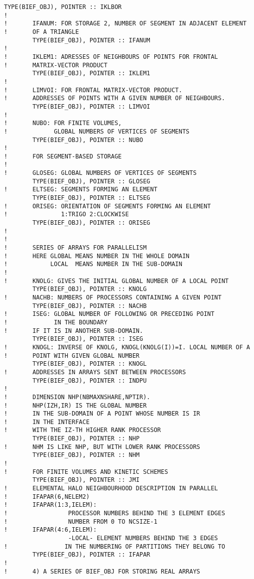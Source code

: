 \begin{lstlisting}[language=TelFortran]
        TYPE(BIEF_OBJ), POINTER :: IKLBOR
!
!       IFANUM: FOR STORAGE 2, NUMBER OF SEGMENT IN ADJACENT ELEMENT
!       OF A TRIANGLE
        TYPE(BIEF_OBJ), POINTER :: IFANUM
!
!       IKLEM1: ADRESSES OF NEIGHBOURS OF POINTS FOR FRONTAL
!       MATRIX-VECTOR PRODUCT
        TYPE(BIEF_OBJ), POINTER :: IKLEM1
!
!       LIMVOI: FOR FRONTAL MATRIX-VECTOR PRODUCT.
!       ADDRESSES OF POINTS WITH A GIVEN NUMBER OF NEIGHBOURS.
        TYPE(BIEF_OBJ), POINTER :: LIMVOI
!
!       NUBO: FOR FINITE VOLUMES,
!             GLOBAL NUMBERS OF VERTICES OF SEGMENTS
        TYPE(BIEF_OBJ), POINTER :: NUBO
!
!       FOR SEGMENT-BASED STORAGE
!
!       GLOSEG: GLOBAL NUMBERS OF VERTICES OF SEGMENTS
        TYPE(BIEF_OBJ), POINTER :: GLOSEG
!       ELTSEG: SEGMENTS FORMING AN ELEMENT
        TYPE(BIEF_OBJ), POINTER :: ELTSEG
!       ORISEG: ORIENTATION OF SEGMENTS FORMING AN ELEMENT
!               1:TRIGO 2:CLOCKWISE
        TYPE(BIEF_OBJ), POINTER :: ORISEG
!
!
!       SERIES OF ARRAYS FOR PARALLELISM
!       HERE GLOBAL MEANS NUMBER IN THE WHOLE DOMAIN
!            LOCAL  MEANS NUMBER IN THE SUB-DOMAIN
!
!       KNOLG: GIVES THE INITIAL GLOBAL NUMBER OF A LOCAL POINT
        TYPE(BIEF_OBJ), POINTER :: KNOLG
!       NACHB: NUMBERS OF PROCESSORS CONTAINING A GIVEN POINT
        TYPE(BIEF_OBJ), POINTER :: NACHB
!       ISEG: GLOBAL NUMBER OF FOLLOWING OR PRECEDING POINT
!             IN THE BOUNDARY
!       IF IT IS IN ANOTHER SUB-DOMAIN.
        TYPE(BIEF_OBJ), POINTER :: ISEG
!       KNOGL: INVERSE OF KNOLG, KNOGL(KNOLG(I))=I. LOCAL NUMBER OF A
!       POINT WITH GIVEN GLOBAL NUMBER
        TYPE(BIEF_OBJ), POINTER :: KNOGL
!       ADDRESSES IN ARRAYS SENT BETWEEN PROCESSORS
        TYPE(BIEF_OBJ), POINTER :: INDPU
!
!       DIMENSION NHP(NBMAXNSHARE,NPTIR).
!       NHP(IZH,IR) IS THE GLOBAL NUMBER
!       IN THE SUB-DOMAIN OF A POINT WHOSE NUMBER IS IR
!       IN THE INTERFACE
!       WITH THE IZ-TH HIGHER RANK PROCESSOR
        TYPE(BIEF_OBJ), POINTER :: NHP
!       NHM IS LIKE NHP, BUT WITH LOWER RANK PROCESSORS
        TYPE(BIEF_OBJ), POINTER :: NHM
!
!       FOR FINITE VOLUMES AND KINETIC SCHEMES
        TYPE(BIEF_OBJ), POINTER :: JMI
!       ELEMENTAL HALO NEIGHBOURHOOD DESCRIPTION IN PARALLEL
!       IFAPAR(6,NELEM2)
!       IFAPAR(1:3,IELEM):
!                 PROCESSOR NUMBERS BEHIND THE 3 ELEMENT EDGES
!                 NUMBER FROM 0 TO NCSIZE-1
!       IFAPAR(4:6,IELEM):
                  -LOCAL- ELEMENT NUMBERS BEHIND THE 3 EDGES
!                IN THE NUMBERING OF PARTITIONS THEY BELONG TO
        TYPE(BIEF_OBJ), POINTER :: IFAPAR
!
!       4) A SERIES OF BIEF_OBJ FOR STORING REAL ARRAYS

\end{lstlisting}
